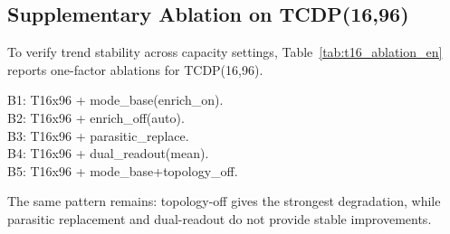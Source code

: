 ﻿\documentclass[10pt,a4paper]{article}
\begin{document}
\subsection{Supplementary Ablation on TCDP(16,96)}

To verify trend stability across capacity settings, Table~\ref{tab:t16_ablation_en}
reports one-factor ablations for TCDP(16,96).

\begin{table}[htbp]
\centering
\scriptsize
\setlength{\tabcolsep}{3.5pt}
\caption{Supplementary one-factor ablation on TCDP(16,96) (5 seeds each).}
\label{tab:t16_ablation_en}
\vspace{2pt}
\raggedright
\footnotesize
B1: T16x96 + mode\_base(enrich\_on).\\
B2: T16x96 + enrich\_off(auto).\\
B3: T16x96 + parasitic\_replace.\\
B4: T16x96 + dual\_readout(mean).\\
B5: T16x96 + mode\_base+topology\_off.
\end{table}

The same pattern remains: topology-off gives the strongest degradation,
while parasitic replacement and dual-readout do not provide stable improvements.
\end{document}
